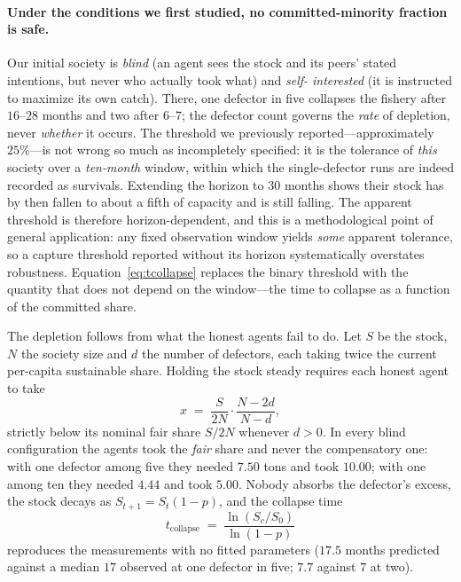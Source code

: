 \documentclass[manuscript,screen,review]{acmart}
\begin{document}
\paragraph{Under the conditions we first studied, no committed-minority fraction
is safe.} Our initial society is \emph{blind} (an agent sees the stock and its
peers' stated intentions, but never who actually took what) and \emph{self-%
interested} (it is instructed to maximize its own catch). There, one defector in
five collapses the fishery after $16$--$28$ months and two after $6$--$7$; the
defector count governs the \emph{rate} of depletion, never \emph{whether} it
occurs. The threshold we previously reported---approximately $25\%$---is not wrong so
much as incompletely specified: it is the tolerance of \emph{this} society over a
\emph{ten-month} window, within which the single-defector runs are indeed
recorded as survivals. Extending the horizon to $30$ months shows their stock has
by then fallen to about a fifth of capacity and is still falling. The apparent
threshold is therefore horizon-dependent, and this is a methodological point of
general application: any fixed observation window yields \emph{some} apparent
tolerance, so a capture threshold reported without its horizon systematically
overstates robustness. Equation~\ref{eq:tcollapse} replaces the binary threshold
with the quantity that does not depend on the window---the time to collapse as a
function of the committed share.

The depletion follows from what the honest agents fail to do. Let $S$ be the
stock, $N$ the society size and $d$ the number of defectors, each taking twice the
current per-capita sustainable share. Holding the stock steady requires each
honest agent to take
\begin{equation}
x \;=\; \frac{S}{2N}\cdot\frac{N-2d}{N-d},
\label{eq:hold}
\end{equation}
strictly below its nominal fair share $S/2N$ whenever $d>0$. In every blind
configuration the agents took the \emph{fair} share and never the compensatory
one: with one defector among five they needed $7.50$ tons and took $10.00$; with
one among ten they needed $4.44$ and took $5.00$. Nobody absorbs the defector's
excess, the stock decays as $S_{t+1}=S_t(1-p)$, and the collapse time
\begin{equation}
t_{\mathrm{collapse}} \;=\; \frac{\ln (S_c/S_0)}{\ln (1-p)}
\label{eq:tcollapse}
\end{equation}
reproduces the measurements with no fitted parameters ($17.5$ months predicted
against a median $17$ observed at one defector in five; $7.7$ against $7$ at two).
\end{document}
